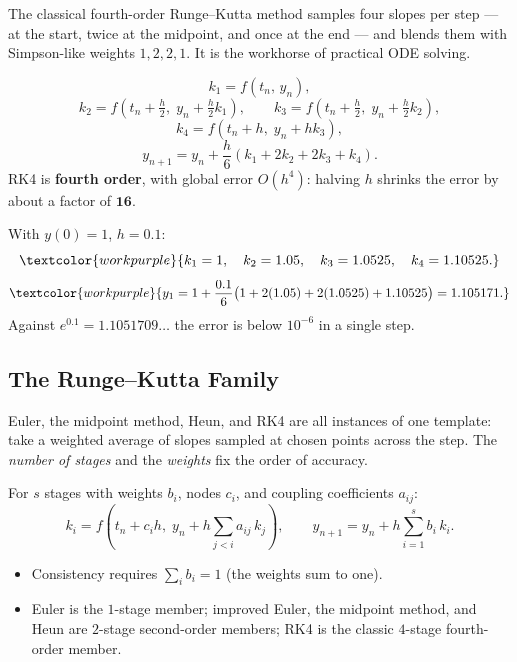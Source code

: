 The classical fourth-order Runge--Kutta method samples four slopes per step --- at
the start, twice at the midpoint, and once at the end --- and blends them with
Simpson-like weights $1,2,2,1$. It is the workhorse of practical ODE solving.

\begin{formulabox}
\[ k_1 = f(t_n,\,y_n), \]
\[ k_2 = f\!\left(t_n+\tfrac{h}{2},\; y_n+\tfrac{h}{2}k_1\right), \qquad
   k_3 = f\!\left(t_n+\tfrac{h}{2},\; y_n+\tfrac{h}{2}k_2\right), \]
\[ k_4 = f\!\left(t_n+h,\; y_n+h k_3\right), \]
\[ y_{n+1} = y_n + \frac{h}{6}\left(k_1 + 2k_2 + 2k_3 + k_4\right). \]
RK4 is \textbf{fourth order}, with global error $O(h^{4})$: halving $h$ shrinks the
error by about a factor of $\mathbf{16}$.
\end{formulabox}

\begin{examplebox}[Worked Example 5.4: One RK4 step for $y'=y$]
With $y(0)=1$, $h=0.1$:
\[ \textcolor{workpurple}{k_1 = 1,\quad k_2 = 1.05,\quad k_3 = 1.0525,\quad k_4 = 1.10525.} \]
\[ \textcolor{workpurple}{y_1 = 1 + \frac{0.1}{6}\big(1 + 2(1.05) + 2(1.0525) + 1.10525\big) = 1.105171.} \]
Against $e^{0.1}=1.1051709\ldots$ the error is below $10^{-6}$ in a single step.
\end{examplebox}

\subsection{The Runge--Kutta Family}

Euler, the midpoint method, Heun, and RK4 are all instances of one template: take
a weighted average of slopes sampled at chosen points across the step. The
\emph{number of stages} and the \emph{weights} fix the order of accuracy.

\begin{formulabox}
For $s$ stages with weights $b_i$, nodes $c_i$, and coupling coefficients
$a_{ij}$:
\[ k_i = f\!\left(t_n + c_i h,\; y_n + h\sum_{j<i} a_{ij}\,k_j\right), \qquad
   y_{n+1} = y_n + h\sum_{i=1}^{s} b_i\,k_i. \]
\begin{itemize}[leftmargin=1.4em, itemsep=2pt]
    \item Consistency requires $\sum_i b_i = 1$ (the weights sum to one).
    \item Euler is the $1$-stage member; improved Euler, the midpoint method, and
          Heun are $2$-stage second-order members; RK4 is the classic $4$-stage
          fourth-order member.
\end{itemize}
\end{formulabox}

